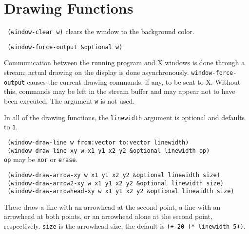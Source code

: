 \section{Drawing Functions}

{\tt \hspace*{0.5in} (window-clear w)} clears the window to the background
color.

{\tt \hspace*{0.5in} (window-force-output \&optional w)}

\vspace{-0.1in}
Communication between the running program and X windows is done through a
stream; actual drawing on the display is done asynchronously.
{\tt window-force-output} causes the current drawing commands, if any,
to be sent to X.  Without this, commands may be left in the stream buffer and
may appear not to have been executed.  The argument {\tt w} is not used.

In all of the drawing functions, the {\tt linewidth} argument is optional
and defaults to {\tt 1}.

\vspace{0.1in}
{\tt \hspace*{0.5in} (window-draw-line w from:vector to:vector linewidth)} \\
{\tt \hspace*{0.5in}
 (window-draw-line-xy w x1 y1 x2 y2 \&optional linewidth op)} \\
 \hspace*{1.0in} {\tt op} may be {\tt xor} or {\tt erase}.

\vspace{0.1in}
{\tt \hspace*{0.5in}
 (window-draw-arrow-xy w x1 y1 x2 y2 \&optional linewidth size)} \\
{\tt \hspace*{0.5in}
 (window-draw-arrow2-xy w x1 y1 x2 y2 \&optional linewidth size)} \\
{\tt \hspace*{0.5in}
 (window-draw-arrowhead-xy w x1 y1 x2 y2 \&optional linewidth size)}

\vspace{-0.1in}
These draw a line with an arrowhead at the second point, a line with an
arrowhead at both points, or an arrowhead alone at the second point,
respectively.  {\tt size} is the arrowhead size; the default is
{\tt (+ 20 (* linewidth 5))}.

